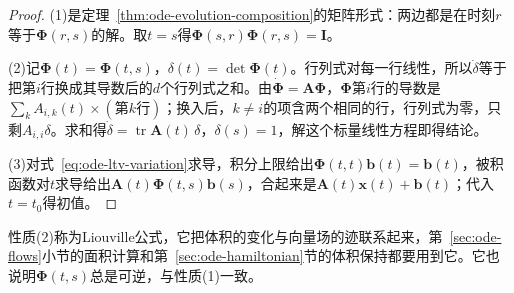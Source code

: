 \begin{proof}
  (1)是定理~\ref{thm:ode-evolution-composition}的矩阵形式：两边都是在时刻$r$等于$\bm\Phi(r,s)$的解。取$t=s$得$\bm\Phi(s,r)\bm\Phi(r,s)=\bm I$。

  (2)记$\bm\Phi(t)=\bm\Phi(t,s)$，$\delta(t)=\det\bm\Phi(t)$。行列式对每一行线性，所以$\dot\delta$等于把第$i$行换成其导数后的$d$个行列式之和。由$\dot{\bm\Phi}=\bm A\bm\Phi$，$\bm\Phi$第$i$行的导数是$\sum_kA_{i,k}(t)\times(\text{第}k\text{行})$；换入后，$k\neq i$的项含两个相同的行，行列式为零，只剩$A_{i,i}\delta$。求和得$\dot\delta=\operatorname{tr}\bm A(t)\,\delta$，$\delta(s)=1$，解这个标量线性方程即得结论。

  (3)对式~\eqref{eq:ode-ltv-variation}求导，积分上限给出$\bm\Phi(t,t)\bm b(t)=\bm b(t)$，被积函数对$t$求导给出$\bm A(t)\bm\Phi(t,s)\bm b(s)$，合起来是$\bm A(t)\bm x(t)+\bm b(t)$；代入$t=t_0$得初值。
\end{proof}

性质(2)称为Liouville公式，它把体积的变化与向量场的迹联系起来，第~\ref{sec:ode-flows}小节的面积计算和第~\ref{sec:ode-hamiltonian}节的体积保持都要用到它。它也说明$\bm\Phi(t,s)$总是可逆，与性质(1)一致。

